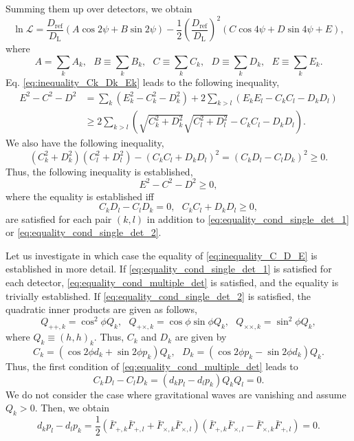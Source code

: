 \documentclass[12pt]{article}
\renewcommand{\L}{\mathcal{L}}
\newcommand{\Dref}{D_{\mathrm{ref}}}
\newcommand{\DL}{D_{\mathrm{L}}}
\newcommand{\bFpk}{\bar{F}_{+, k}}
\newcommand{\bFck}{\bar{F}_{\times, k}}
\newcommand{\bFpl}{\bar{F}_{+, l}}
\newcommand{\bFcl}{\bar{F}_{\times, l}}
\newcommand{\Qppk}{Q_{++,k}}
\newcommand{\Qpck}{Q_{+\times,k}}
\newcommand{\Qcck}{Q_{\times\times,k}}
\begin{document}
Summing them up over detectors, we obtain
\begin{equation}
\ln \L = \frac{\Dref}{\DL} \left( A \cos 2 \psi + B \sin 2 \psi \right) - \frac{1}{2} \left(\frac{\Dref}{\DL}\right)^2 \left(C \cos 4 \psi + D \sin 4 \psi + E\right),
\end{equation}
where
\begin{equation}
A = \sum_k A_k,~~~B \equiv \sum_k B_k,~~~ C \equiv \sum_k C_k, ~~~ D \equiv \sum_k D_k,~~~ E \equiv \sum_k E_k.
\end{equation}
Eq. \eqref{eq:inequality_Ck_Dk_Ek} leads to the following inequality,
\begin{align}
E^2 - C^2 - D^2 &= \sum_k (E^2_k - C^2_k - D^2_k) + 2 \sum_{k>l} (E_k E_l - C_k C_l - D_k D_l) \\
&\geq 2 \sum_{k>l} \left(\sqrt{C^2_k + D^2_k} \sqrt{C^2_l + D^2_l} - C_k C_l - D_k D_l\right).
\end{align}
We also have the following inequality,
\begin{equation}
(C^2_k + D^2_k) (C^2_l + D^2_l) - (C_k C_l + D_k D_l)^2 = (C_k D_l - C_l D_k)^2 \geq 0.
\end{equation}
Thus, the following inequality is established,
\begin{equation}
E^2 - C^2 - D^2 \geq 0, \label{eq:inequality_C_D_E}
\end{equation}
where the equality is established iff
\begin{equation}
C_k D_l - C_l D_k=0,~~~C_k C_l + D_k D_l \geq 0, \label{eq:equality_cond_multiple_det}
\end{equation}
are satisfied for each pair $(k,l)$ in addition to \eqref{eq:equality_cond_single_det_1} or \eqref{eq:equality_cond_single_det_2}.

Let us investigate in which case the equality of \eqref{eq:inequality_C_D_E} is established in more detail.
If \eqref{eq:equality_cond_single_det_1} is satisfied for each detector, \eqref{eq:equality_cond_multiple_det} is satisfied, and the equality is trivially established.
If \eqref{eq:equality_cond_single_det_2} is satisfied, the quadratic inner products are given as follows,
\begin{equation}
\Qppk = \cos^2 \phi Q_k,~~~\Qpck = \cos \phi \sin \phi Q_k,~~~\Qcck = \sin^2 \phi Q_k,
\end{equation}
where $Q_k \equiv (h, h)_k$.
Thus, $C_k$ and $D_k$ are given by
\begin{equation}
C_k = (\cos 2 \phi d_k + \sin 2 \phi p_k) Q_k,~~~D_k = (\cos 2 \phi p_k - \sin 2 \phi d_k) Q_k.
\end{equation}
Thus, the first condition of \eqref{eq:equality_cond_multiple_det} leads to
\begin{equation}
C_k D_l - C_l D_k = (d_k p_l - d_l p_k) Q_k Q_l = 0.
\end{equation}
We do not consider the case where gravitational waves are vanishing and assume $Q_k > 0$.
Then, we obtain
\begin{equation}
d_k p_l - d_l p_k = \frac{1}{2} (\bFpk \bFpl + \bFck \bFcl) (\bFpk \bFcl -\bFck \bFpl) = 0. \label{eq:cond1}
\end{equation}
\end{document}
